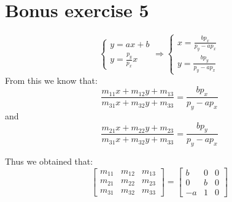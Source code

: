 \documentclass[tikz,14pt,fleqn]{article}
\begin{document}
\section{Bonus exercise 5}

\begin{equation}
   \begin{cases}
      y = ax + b \\
      y = \frac{p_y}{p_x} x
   \end{cases}
   \Rightarrow
   \begin{cases}
      x = \frac{bp_x}{p_y - ap_x} \\
      y = \frac{bp_y}{p_y - ap_x}
   \end{cases}
\end{equation}
From this we know that:
\[
   \frac{m_{11}x + m_{12}y + m_{13}}{m_{31}x + m_{32}y + m_{33}} = \frac{bp_x}{p_y - ap_x}
\]
and
\[
   \frac{m_{21}x + m_{22}y + m_{23}}{m_{31}x + m_{32}y + m_{33}} = \frac{bp_y}{p_y - ap_x}
\]

Thus we obtained that: 
\[
   \begin{bmatrix}
      m_{11} & m_{12} & m_{13} \\
      m_{21} & m_{22} & m_{23} \\
      m_{31} & m_{32} & m_{33}
   \end{bmatrix}
   = 
   \begin{bmatrix}
      b & 0 & 0 \\
      0 & b & 0 \\
      -a & 1 & 0
   \end{bmatrix}
\]
\end{document}
